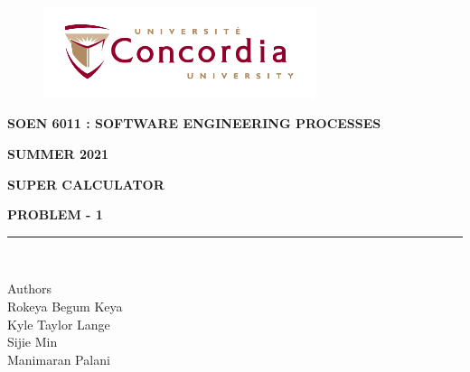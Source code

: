 \documentclass[a4paper, 11pt]{report}
\begin{document}
\begin{titlepage}
\vspace*{0.7in}
\begin{center}
\begin{figure}[htb]
\begin{center}
\includegraphics[width=8cm]{univ_logo}
\end{center}
\end{figure}
\vspace*{0.3in}
\begin{Large}
\textbf{SOEN 6011 : SOFTWARE ENGINEERING PROCESSES} \\
\end{Large}
\vspace*{0.1in}
\begin{Large}
\textbf{SUMMER 2021} \\
\end{Large}
\vspace*{0.7in}
\begin{Large}
\textbf{SUPER CALCULATOR} \\
\end{Large}
\vspace*{0.5in}
\begin{Large}
\textbf{PROBLEM - 1} \\
\end{Large}
\vspace*{0.3in}
\vspace*{0.3in}
\rule{80mm}{0.1mm}\\
\vspace*{0.1in}
\begin{large}
Authors \\
\vspace*{0.1in}
Rokeya Begum Keya\\
\vspace*{0.1in}
Kyle Taylor Lange\\
\vspace*{0.1in}
Sijie Min\\
\vspace*{0.1in}
Manimaran Palani\\
\vspace*{0.3in}
\date{\normalsize\today} 
\end{large}
\end{center}
\end{titlepage}
\end{document}

